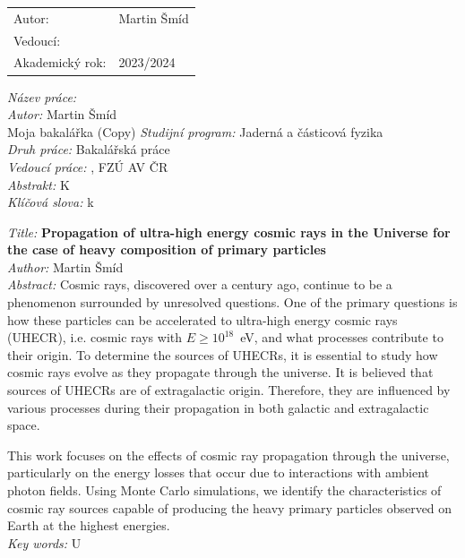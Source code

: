 \documentclass[a4paper,12pt]{report}
\newcommand{\studijniprogram}{Jaderná a částicová fyzika}
\newcommand{\nazeven}{Propagation of ultra-high energy cosmic rays in the Universe for the case of heavy composition of primary particles}
\newcommand{\nazevcz}{}
\newcommand{\autor}{Martin Šmíd}
\newcommand{\rok}{2023/2024}
\newcommand{\vedouci}{}
\newcommand{\pracoviste}{FZÚ AV ČR}
\newcommand{\klicova}{k}
\newcommand{\keyword}{U}
\newcommand{\abstrCZ}{K }
\newcommand{\abstrEN}{Cosmic rays, discovered over a century ago, continue to be a phenomenon surrounded by unresolved questions. One of the primary questions is how these particles can be accelerated to ultra-high energy cosmic rays (UHECR), i.e. cosmic rays with $E \ge 10^{18}$~eV, and what processes contribute to their origin. To determine the sources of UHECRs, it is essential to study how cosmic rays evolve as they propagate through the universe.  It is believed that sources of UHECRs are of extragalactic origin. Therefore, they are influenced by various processes during their propagation in both galactic and extragalactic space.

This work focuses on the effects of cosmic ray propagation through the universe, particularly on the energy losses that occur due to interactions with ambient photon fields. Using Monte Carlo simulations, we identify the characteristics of cosmic ray sources capable of producing the heavy primary particles observed on Earth at the highest energies. }
\begin{document}
  \vfill
  {\large
  \begin{tabular}{ll}
  Autor: & \autor\\
  Vedoucí: & \vedouci\\
  Akademický rok: & \rok
  \end{tabular}
  }

\newpage 
\thispagestyle{empty} 


\noindent



\newpage 
\thispagestyle{empty} 

\newpage 
\thispagestyle{empty} 


\noindent



\newpage 
\thispagestyle{empty} 

           
              



\newpage
\thispagestyle{empty}

{
	\setlength{\parindent}{0pt}
	
	\textit{Název práce:}
	\textbf{\nazevcz} \\
	\textit{Autor:} \autor \\Moja bakalářka (Copy)
	\textit{Studijní program:} \studijniprogram \\
	
	\textit{Druh práce:} Bakalářská práce \\
	
	\textit{Vedoucí práce:} \vedouci, \pracoviste \\
	
	
	
	\textit{Abstrakt:} 
	\abstrCZ \\
	
	\textit{Klíčová slova:} \klicova
}
\newpage
\thispagestyle{empty}
{
	\setlength{\parindent}{0pt}
\textit{Title:}
\textbf{\nazeven} \\

\textit{Author:} \autor \\

\textit{Abstract:} 
\abstrEN \\

\textit{Key words:} \keyword
}
\end{document}
